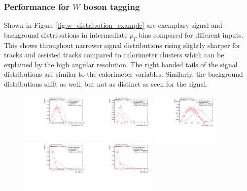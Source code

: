 \subsubsection{Performance for $W$ boson tagging}
Shown in Figure \ref{fig:w_distribution_example} are exemplary signal and background distributions in intermediate $p_T$ bins compared for different inputs. This shows throughout narrower signal distributions rising slightly sharper for tracks and assisted tracks compared to calorimeter clusters which can be explained by the high angular resolution. The right handed tails of the signal distributions are similar to the calorimeter variables. Similarly, the background distributions shift as well, but not as distinct as seen for the signal.
\begin{figure}[htp]
\includegraphics[width=0.3\textwidth]{sascha_input/plots/W/Beta1/h_recoJet_C2_bin6.pdf} 
\includegraphics[width=0.3\textwidth]{sascha_input/plots/W/Beta1/h_recoJet_D2_bin5.pdf} 	
\includegraphics[width=0.3\textwidth]{sascha_input/plots/W/Beta1/h_recoJet_nSub21_bin5.pdf}
\bigskip
\includegraphics[width=0.3\textwidth]{sascha_input/plots/W/Beta1/h_assisted_tj_C2_bin6.pdf} \hspace{6mm}
\includegraphics[width=0.3\textwidth]{sascha_input/plots/W/Beta1/h_assisted_tj_D2_bin5.pdf} \hspace{6mm}

\end{figure}
